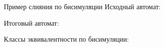 \begin{frame}{Пример слияния по бисимуляции} %
	Исходный автомат:


	Итоговый автомат:


	Классы эквивалентности по бисимуляции:



\end{frame}
